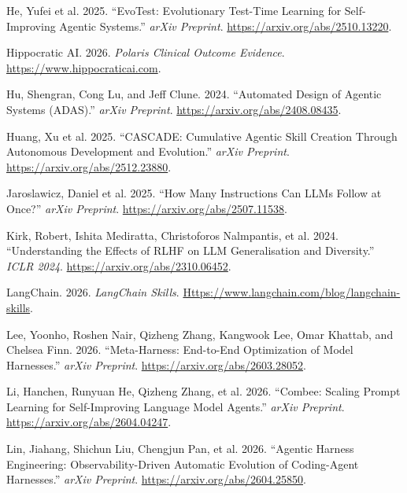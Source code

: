 \documentclass[
]{article}
\newlength{\cslhangindent}
\newenvironment{CSLReferences}[2] %
 {\begin{list}{}{%
  \setlength{\itemindent}{0pt}
  \setlength{\leftmargin}{0pt}
  \setlength{\parsep}{0pt}
  \ifodd #1
   \setlength{\leftmargin}{\cslhangindent}
   \setlength{\itemindent}{-1\cslhangindent}
  \fi
  \setlength{\itemsep}{#2\baselineskip}}}
 {\end{list}}
\begin{document}
\begin{CSLReferences}{1}{1}
{He, Yufei et al.} 2025. {``{EvoTest}: Evolutionary Test-Time Learning
for Self-Improving Agentic Systems.''} \emph{arXiv Preprint}.
\url{https://arxiv.org/abs/2510.13220}.

Hippocratic AI. 2026. \emph{Polaris Clinical Outcome Evidence}.
\url{https://www.hippocraticai.com}.

Hu, Shengran, Cong Lu, and Jeff Clune. 2024. {``Automated Design of
Agentic Systems ({ADAS}).''} \emph{arXiv Preprint}.
\url{https://arxiv.org/abs/2408.08435}.

{Huang, Xu et al.} 2025. {``{CASCADE}: Cumulative Agentic Skill Creation
Through Autonomous Development and Evolution.''} \emph{arXiv Preprint}.
\url{https://arxiv.org/abs/2512.23880}.

{Jaroslawicz, Daniel et al.} 2025. {``How Many Instructions Can {LLMs}
Follow at Once?''} \emph{arXiv Preprint}.
\url{https://arxiv.org/abs/2507.11538}.

{Kirk, Robert, Ishita Mediratta, Christoforos Nalmpantis, et al.} 2024.
{``Understanding the Effects of {RLHF} on {LLM} Generalisation and
Diversity.''} \emph{ICLR 2024}. \url{https://arxiv.org/abs/2310.06452}.

LangChain. 2026. \emph{{LangChain} Skills}.
\href{https://www.langchain.com/blog/langchain-skills}{Https://www.langchain.com/blog/langchain-skills}.

Lee, Yoonho, Roshen Nair, Qizheng Zhang, Kangwook Lee, Omar Khattab, and
Chelsea Finn. 2026. {``{Meta-Harness}: End-to-End Optimization of Model
Harnesses.''} \emph{arXiv Preprint}.
\url{https://arxiv.org/abs/2603.28052}.

Li, Hanchen, Runyuan He, Qizheng Zhang, et al. 2026. {``{Combee}:
Scaling Prompt Learning for Self-Improving Language Model Agents.''}
\emph{arXiv Preprint}. \url{https://arxiv.org/abs/2604.04247}.

Lin, Jiahang, Shichun Liu, Chengjun Pan, et al. 2026. {``Agentic Harness
Engineering: Observability-Driven Automatic Evolution of Coding-Agent
Harnesses.''} \emph{arXiv Preprint}.
\url{https://arxiv.org/abs/2604.25850}.


\end{CSLReferences}
\end{document}
